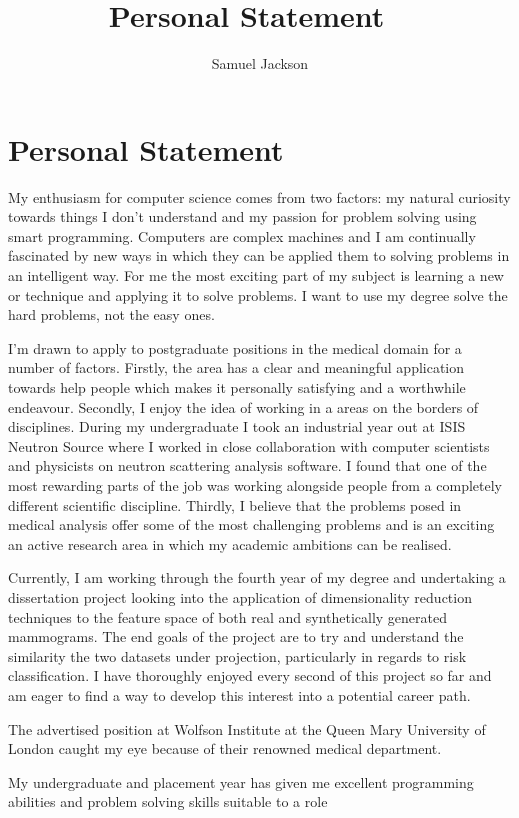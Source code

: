 \documentclass[paper=a4, fontsize=11pt]{scrartcl}	%
\title{
	\vspace{-0.5in} 	\usefont{OT1}{bch}{b}{n}
	 Personal Statement \
}
\author{
	\usefont{OT1}{bch}{m}{n} Samuel Jackson
}
\date{}
\numberwithin{equation}{section}															%
\numberwithin{figure}{section}																%
\numberwithin{table}{section}
\begin{document}
\section*{Personal Statement}
My enthusiasm for computer science comes from two factors: my natural curiosity towards things I don't understand and my passion for problem solving using smart programming. Computers are complex machines and I am continually fascinated by new ways in which they can be applied them to solving problems in an intelligent way. For me the most exciting part of my subject is learning a new or technique and applying it to solve problems. I want to use my degree solve the hard problems, not the easy ones.

I'm drawn to apply to postgraduate positions in the medical domain for a number of factors. Firstly, the area has a clear and meaningful application towards help people which makes it personally satisfying and a worthwhile endeavour. Secondly, I enjoy the idea of working in a areas on the borders of disciplines. During my undergraduate I took an industrial year out at ISIS Neutron Source where I worked in close collaboration with computer scientists and physicists on neutron scattering analysis software. I found that one of the most rewarding parts of the job was working alongside people from a completely different scientific discipline. Thirdly, I believe that the problems posed in medical analysis offer some of the most challenging problems and is an exciting an active research area in which my academic ambitions can be realised.

Currently, I am working through the fourth year of my degree and undertaking a dissertation project looking into the application of dimensionality reduction techniques to the feature space of both real and synthetically generated mammograms. The end goals of the project are to try and understand the similarity the two datasets under projection, particularly in regards to risk classification. I have thoroughly enjoyed every second of this project so far and am eager to find a way to develop this interest into a potential career path.

The advertised position at Wolfson Institute at the Queen Mary University of London caught my eye because of their renowned medical department.

My undergraduate and placement year has given me excellent programming abilities and problem solving skills suitable to a role
\end{document}
